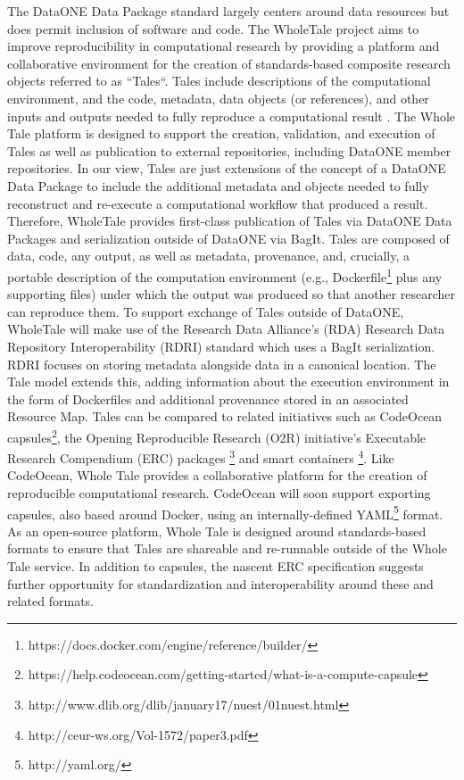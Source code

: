 \documentclass[conference]{IEEEtran}
\begin{document}
The DataONE Data Package standard largely centers around data resources but does permit inclusion of software and code.
The WholeTale project aims to improve reproducibility in computational research by providing a platform and collaborative environment for the creation of standards-based composite research objects referred to as ``Tales``.
Tales include descriptions of the computational environment, and the code, metadata, data objects (or references), and other inputs and outputs needed to fully reproduce a computational result \cite{brinckman2018}.
The Whole Tale platform is designed to support the creation, validation, and execution of Tales as well as publication to external repositories, including DataONE member repositories.
In our view, Tales are just extensions of the concept of a DataONE Data Package to include the additional metadata and objects needed to fully reconstruct and re-execute a computational workflow that produced a result.
Therefore, WholeTale provides first-class publication of Tales via DataONE Data Packages and serialization outside of DataONE via BagIt.
Tales are composed of data, code, any output, as well as metadata, provenance, and, crucially, a portable description of the computation environment (e.g., Dockerfile\footnote{https://docs.docker.com/engine/reference/builder/} plus any supporting files) under which the output was produced so that another researcher can reproduce them.
To support exchange of Tales outside of DataONE, WholeTale will make use of the Research Data Alliance’s (RDA) Research Data Repository Interoperability (RDRI) standard which uses a BagIt serialization.
RDRI focuses on storing metadata alongside data in a canonical location.
The Tale model extends this, adding information about the execution environment in the form of Dockerfiles and additional provenance stored in an associated Resource Map.
Tales can be compared to related initiatives such as CodeOcean capsules\footnote{https://help.codeocean.com/getting-started/what-is-a-compute-capsule}, the Opening Reproducible Research (O2R) initiative's Executable Research Compendium (ERC) packages \footnote{http://www.dlib.org/dlib/january17/nuest/01nuest.html} and smart containers \footnote{http://ceur-ws.org/Vol-1572/paper3.pdf}.
Like CodeOcean, Whole Tale provides a collaborative platform for the creation of reproducible computational research.
CodeOcean will soon support exporting capsules, also based around Docker, using an internally-defined YAML\footnote{http://yaml.org/} format.
As an open-source platform, Whole Tale is designed around standards-based formats to ensure that Tales are shareable and re-runnable outside of the Whole Tale service.
In addition to capsules, the nascent ERC specification suggests further opportunity for standardization and interoperability around these and related formats.
\end{document}
